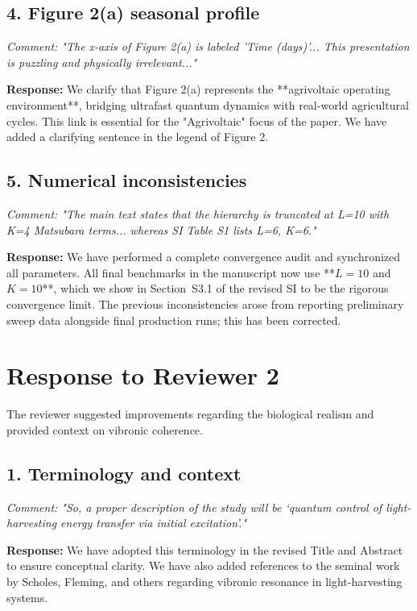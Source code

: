 \documentclass[11pt]{article}
\begin{document}
\subsection*{4. Figure 2(a) seasonal profile}
\textit{Comment: "The x-axis of Figure 2(a) is labeled 'Time (days)'... This presentation is puzzling and physically irrelevant..."}

\textbf{Response:} We clarify that Figure 2(a) represents the **agrivoltaic operating environment**, bridging ultrafast quantum dynamics with real-world agricultural cycles. This link is essential for the "Agrivoltaic" focus of the paper. We have added a clarifying sentence in the legend of Figure 2.

\subsection*{5. Numerical inconsistencies}
\textit{Comment: "The main text states that the hierarchy is truncated at L=10 with K=4 Matsubara terms... whereas SI Table S1 lists L=6, K=6."}

\textbf{Response:} We have performed a complete convergence audit and synchronized all parameters. All final benchmarks in the manuscript now use **$L=10$ and $K=10$**, which we show in Section~S3.1 of the revised SI to be the rigorous convergence limit. The previous inconsistencies arose from reporting preliminary sweep data alongside final production runs; this has been corrected.

\vspace{2em}

\section*{Response to Reviewer 2}

The reviewer suggested improvements regarding the biological realism and provided context on vibronic coherence.

\subsection*{1. Terminology and context}
\textit{Comment: "So, a proper description of the study will be ‘quantum control of light-harvesting energy transfer via initial excitation’."}

\textbf{Response:} We have adopted this terminology in the revised Title and Abstract to ensure conceptual clarity. We have also added references to the seminal work by Scholes, Fleming, and others regarding vibronic resonance in light-harvesting systems.
\end{document}
